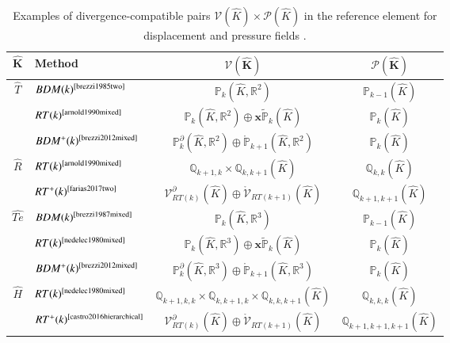 \documentclass[english,11pt,3p,number,sort&compress]{elsarticle}
\begin{document}
\begin{table}[h]
    \centering
    \renewcommand{\arraystretch}{1.5}
    \begin{tabular}{c l c c}
        \toprule
        $\bm{\hat{K}}$ & \textbf{Method} & $\bm{\mathcal{V}(\hat{K})}$ & $\bm{\mathcal{P}(\hat{K})}$ \\
        \midrule
        \multirow{3}{*}{$\hat{T}$} 
        & $BDM(k)^{\text{\cite{brezzi1985two}}}$ & $\mathbb{P}_k(\hat{K}, \mathbb{R}^2)$ & $\mathbb{P}_{k-1}(\hat{K})$ \\
        & $RT(k)^{\text{\cite{arnold1990mixed}}}$ & $\mathbb{P}_k(\hat{K}, \mathbb{R}^2) \oplus \mathbf{x} \tilde{\mathbb{P}}_k(\hat{K})$ & $\mathbb{P}_k(\hat{K})$ \\
        & $BDM^+(k)^{\text{\cite{brezzi2012mixed}}}$ & $\mathbb{P}_k^{\partial}(\hat{K}, \mathbb{R}^2) \oplus \mathring{\mathbb{P}}_{k+1}(\hat{K}, \mathbb{R}^2)$ & $\mathbb{P}_k(\hat{K})$ \\
        \midrule
        \multirow{2}{*}{$\hat{R}$} 
        & $RT(k)^{\text{\cite{arnold1990mixed}}}$ & $\mathbb{Q}_{k+1,k} \times \mathbb{Q}_{k,k+1}(\hat{K})$ & $\mathbb{Q}_{k,k}(\hat{K})$ \\
        & $RT^+(k)^{\text{\cite{farias2017two}}}$ & $\mathcal{V}_{RT(k)}^\partial(\hat{K}) \oplus \mathring{\mathcal{V}}_{RT(k+1)}(\hat{K})$ & $\mathbb{Q}_{k+1,k+1}(\hat{K})$ \\
        \midrule
        \multirow{3}{*}{$\hat{Te}$} 
        & $BDM(k)^{\text{\cite{brezzi1987mixed}}}$ & $\mathbb{P}_k(\hat{K}, \mathbb{R}^3)$ & $\mathbb{P}_{k-1}(\hat{K})$ \\
        & $RT(k)^{\text{\cite{nedelec1980mixed}}}$ & $\mathbb{P}_k(\hat{K}, \mathbb{R}^3) \oplus \mathbf{x} \tilde{\mathbb{P}}_k(\hat{K})$ & $\mathbb{P}_k(\hat{K})$ \\
        & $BDM^+(k)^{\text{\cite{brezzi2012mixed}}}$ & $\mathbb{P}_k^\partial(\hat{K}, \mathbb{R}^3) \oplus \mathring{\mathbb{P}}_{k+1}(\hat{K}, \mathbb{R}^3)$ & $\mathbb{P}_k(\hat{K})$ \\
        \midrule
        \multirow{2}{*}{$\hat{H}$} 
        & $RT(k)^{\text{\cite{nedelec1980mixed}}}$ & $\mathbb{Q}_{k+1,k,k} \times \mathbb{Q}_{k,k+1,k} \times \mathbb{Q}_{k,k,k+1}(\hat{K})$ & $\mathbb{Q}_{k,k,k}(\hat{K})$ \\
        & $RT^+(k)^{\text{\cite{castro2016hierarchical}}}$ & $\mathcal{V}_{RT(k)}^\partial(\hat{K}) \oplus \mathring{\mathcal{V}}_{RT(k+1)}(\hat{K})$ & $\mathbb{Q}_{k+1,k+1,k+1}(\hat{K})$ \\
        \bottomrule
    \end{tabular}
    \caption{Examples of divergence-compatible pairs $\mathcal{V}(\hat{K}) \times \mathcal{P}(\hat{K})$ in the reference element for displacement and pressure fields \cite{carvalho2024semi}.}
    \label{tab:FE_pairs}
\end{table}
\end{document}
